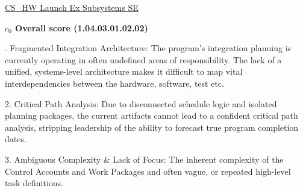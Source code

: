 % 


\begin{frame}{\href{run:../local/source-docs/1.04.03.01.02.02.pdf}{CS\_HW Launch Ex Subsystems SE}}
\centering
{}
\par
\vspace{0.75em}
\textbf{\small{\(c_0\) Overall score {\tiny (1.04.03.01.02.02)}}}\\\par
\vspace{0.5em}
\begin{minipage}{0.85\textwidth}
\raggedright
\fontsize{7}{9}. Fragmented Integration Architecture: The program's integration planning is currently operating in often undefined areas of responsibility. The lack of a unified, systems-level architecture makes it difficult to map vital interdependencies between the hardware, software, test etc.\par\vspace{0.5em}2. Critical Path Analysis: Due to disconnected schedule logic and isolated planning packages, the current artifacts cannot lead to a confident critical path analysis, stripping leadership of the ability to forecast true program completion dates.\par\vspace{0.5em}3. Ambiguous Complexity \& Lack of Focus: The inherent complexity of the Control Accounts and Work Packages and often vague, or repeated high-level task definitions.\par
\end{minipage}
\end{frame}
%
